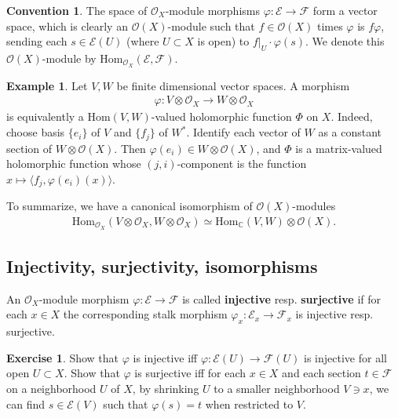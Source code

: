 \documentclass[12pt,a4paper,notitlepage]{article}
\theoremstyle{definition}
\newtheorem{eg}[df]{Example}
\newtheorem{exe}[df]{Exercise}
\newtheorem{cv}[df]{Convention}
\theoremstyle{plain}
\newcommand{\Hom}{\mathrm{Hom}}
\newcommand{\bk}[1]{\langle {#1}\rangle}
\newcommand{\scr}{\mathscr}
\newcommand{\Cbb}{\mathbb C}
\numberwithin{equation}{section}
\begin{document}
\begin{cv}\label{lb103}
	The space of $\scr O_X$-module morphisms $\varphi:\scr E\rightarrow\scr F$ form a vector space, which is clearly an $\scr O(X)$-module such that $f\in\scr O(X)$ times $\varphi$ is $f\varphi$, sending each $s\in \scr E(U)$ (where $U\subset X$ is open) to $f|_U\cdot \varphi(s)$. We denote this $\scr O(X)$-module by $\Hom_{\scr O_X}(\scr E,\scr F)$. \index{HomEF@$\Hom_{\scr O_X}(\scr E,\scr F)$}
\end{cv}



\begin{eg}\label{lb104}
	Let $V,W$ be finite dimensional vector spaces. A morphism 
	\begin{align*}
		\varphi:V\otimes\scr O_X\rightarrow W\otimes\scr O_X	
	\end{align*}
	is equivalently a $\Hom(V,W)$-valued holomorphic function $\Phi$ on $X$. Indeed, choose basis $\{e_i\}$ of $V$ and $\{f_j\}$ of $W^*$. Identify each vector of $W$ as a constant section of $W\otimes\scr O(X)$. Then $\varphi(e_i)\in W\otimes\scr O(X)$, and $\Phi$  is a matrix-valued holomorphic function whose $(j,i)$-component is the function $x\mapsto\bk{f_j,\varphi(e_i)(x)}$.
	
	To summarize, we have a canonical isomorphism of $\scr O(X)$-modules
	\begin{align*}
		\Hom_{\scr O_X}(V\otimes\scr O_X,W\otimes\scr O_X)\simeq \Hom_\Cbb(V,W)\otimes\scr O(X).	
	\end{align*}
	\hfill\qedsymbol
\end{eg}




\subsection{Injectivity, surjectivity, isomorphisms}

An $\scr O_X$-module morphism $\varphi:\scr E\rightarrow\scr F$ is called \textbf{injective} resp. \textbf{surjective} if for each $x\in X$ the corresponding stalk morphism $\varphi_x:\scr E_x\rightarrow\scr F_x$ is injective resp. surjective.

\begin{exe}
	Show that $\varphi$ is injective iff $\varphi:\scr E(U)\rightarrow\scr F(U)$ is injective for all open $U\subset X$. Show that $\varphi$ is surjective iff for each $x\in X$ and each section $t\in\scr F$ on a neighborhood $U$ of $X$, by shrinking $U$ to a smaller neighborhood $V\ni x$, we can find $s\in\scr E(V)$ such that $\varphi(s)=t$ when restricted to $V$.
\end{exe}
\end{document}
